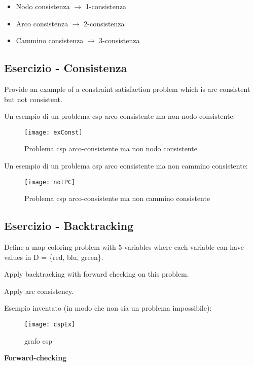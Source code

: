 \begin{itemize}
 \item Nodo consistenza $\rightarrow$ 1-consistenza
 \item Arco consistenza $\rightarrow$ 2-consistenza
 \item Cammino consistenza $\rightarrow$ 3-consistenza
\end{itemize}

\subsection{Esercizio - Consistenza}

Provide an example of a constraint satisfaction problem which is arc
consistent but not consistent.

Un esempio di un problema csp arco consistente ma non nodo consistente:

\begin{figure}[H]
\centering
\texttt{[image: exConst]}
\caption{Problema csp arco-consistente ma non nodo consistente}
\label{fig:fc}
\end{figure}

Un esempio di un problema csp arco consistente ma non cammino consistente:

\begin{figure}[H]
\centering
\texttt{[image: notPC]}
\caption{Problema csp arco-consistente ma non cammino consistente}
\label{fig:fc}
\end{figure}

\subsection{Esercizio - Backtracking}

Define a map coloring problem with 5 variables where each variable can have
values in D = \{red, blu, green\}.

Apply backtracking with forward checking on this problem.

Apply arc consistency.

Esempio inventato (in modo che non sia un problema impossibile):

\begin{figure}[H]
\centering
\texttt{[image: cspEx]}
\caption{grafo csp}
\end{figure}

\textbf{Forward-checking}

